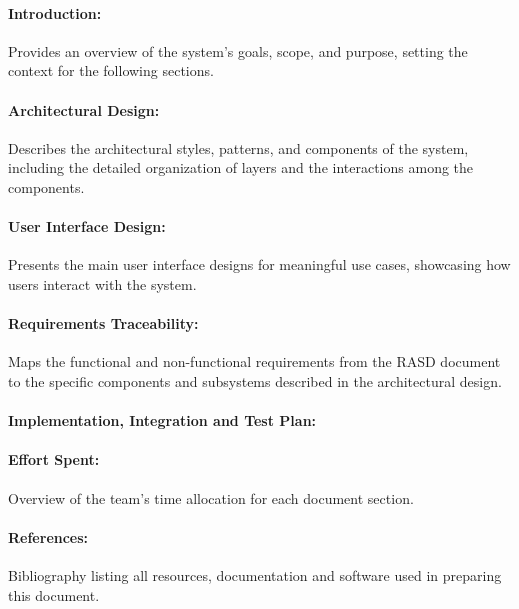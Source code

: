\paragraph{Introduction:} Provides an overview of the system's goals, scope, and purpose, setting the context for the following sections.
  
\paragraph{Architectural Design:} Describes the architectural styles, patterns, and components of the system, including the detailed organization of layers and the interactions among the components.

\paragraph{User Interface Design:} Presents the main user interface designs for meaningful use cases, showcasing how users interact with the system.

\paragraph{Requirements Traceability:} Maps the functional and non-functional requirements from the RASD document to the specific components and subsystems described in the architectural design.

\paragraph{Implementation, Integration and Test Plan:} 

\paragraph{Effort Spent:} Overview of the team's time allocation for each document section.

\paragraph{References:} Bibliography listing all resources, documentation and software used in preparing this document.